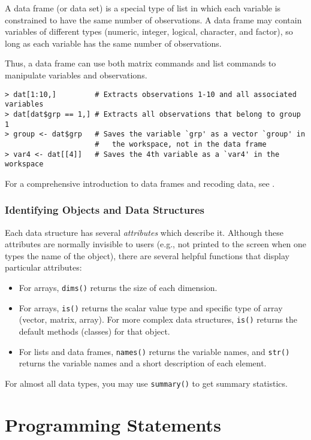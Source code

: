A data frame (or data set) is a special type of list in which each
variable is constrained to have the same number of observations.  A
data frame may contain variables of different types (numeric,
integer, logical, character, and factor), so long as each variable has
the same number of observations. 

Thus, a data frame can use both matrix commands and list commands to
manipulate variables and observations.  
\begin{verbatim}
> dat[1:10,]         # Extracts observations 1-10 and all associated variables  
> dat[dat$grp == 1,] # Extracts all observations that belong to group 1 
> group <- dat$grp   # Saves the variable `grp' as a vector `group' in
                     #   the workspace, not in the data frame
> var4 <- dat[[4]]   # Saves the 4th variable as a `var4' in the workspace
\end{verbatim} 

For a comprehensive introduction to data frames and recoding data, see
.

\subsection{Identifying Objects and Data Structures}

Each data structure has several \emph{attributes} which describe it.
Although these attributes are normally invisible to users (e.g., not
printed to the screen when one types the name of the object), there are
several helpful functions that display particular attributes:  
\begin{itemize}
\item For arrays, {\tt dims()} returns the size of each dimension.  
\item For arrays, {\tt is()} returns the scalar value type and
specific type of array (vector, matrix, array).  For more complex data
structures, {\tt is()} returns the default methods (classes) for that object. 
\item For lists and data frames, {\tt names()} returns the variable
names, and {\tt str()} returns the variable names and a short
description of each element.  
\end{itemize}  
For almost all data types, you may use {\tt summary()} to get summary
statistics.  

\chapter{Programming Statements}

